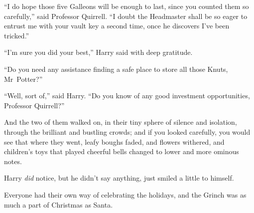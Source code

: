 “I do hope those five Galleons will be enough to last, since you counted them so carefully,” said Professor Quirrell.
“I doubt the Headmaster shall be so eager to entrust me with your vault key a second time, once he discovers I’ve been tricked.”

“I’m sure you did your best,” Harry said with deep gratitude.

“Do you need any assistance finding a safe place to store all those Knuts, Mr~Potter?”

“Well, sort of,” said Harry.
“Do you know of any good investment opportunities, Professor Quirrell?”

And the two of them walked on, in their tiny sphere of silence and isolation, through the brilliant and bustling crowds; and if you looked carefully, you would see that where they went, leafy boughs faded, and flowers withered, and children’s toys that played cheerful bells changed to lower and more ominous notes.

Harry \emph{did} notice, but he didn’t say anything, just smiled a little to himself.

Everyone had their own way of celebrating the holidays, and the Grinch was as much a part of Christmas as Santa.

